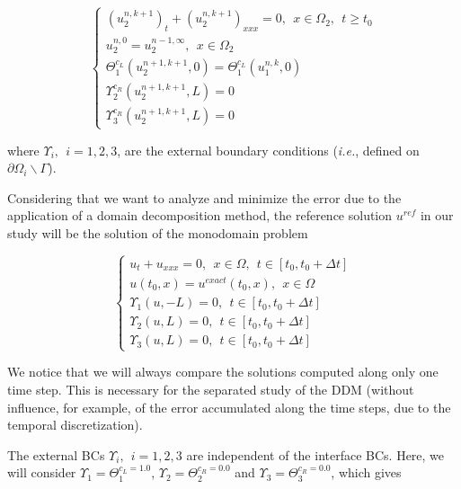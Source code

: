 \begin{equation}
    \label{eq:problemDDM2}
    \begin{cases}
        (u_2^{n,k+1})_t + (u_2^{n,k+1})_{xxx} = 0 , \ \ x \in \Omega_2, \ \ t \geq t_0\\
        u_2^{n,0} = u_2^{n-1,\infty} , \ \ x \in \Omega_2 \\
        \Theta_1^{c_L}(u_2^{n+1,k+1},0) = \Theta_1^{c_L}(u_1^{n,k},0) \\
        \Upsilon_2^{c_R}(u_2^{n+1,k+1},L) = 0 \\
        \Upsilon_3^{c_R}(u_2^{n+1,k+1},L) = 0
     \end{cases}
\end{equation}

\noindent where $ \Upsilon_i, \ \ i=1,2,3$, are the external boundary conditions (\emph{i.e.}, defined on $\partial \Omega_i \backslash \Gamma$). 

\indent Considering that we want to analyze and minimize the error due to the application of a domain decomposition method, the reference solution $u^{ref}$ in our study will be the solution of the monodomain problem

\begin{equation}
	\label{eq:problemMonodomain}
	\begin{cases}
	u_t + u_{xxx} = 0, \ \ x \in \Omega, \ \ t \in [t_0, t_0+\Delta t] \\
	u(t_0,x) = u^{exact}(t_0,x) , \ \ x \in \Omega \\ 
	\Upsilon_1(u,-L) = 0, \ \ t \in [t_0, t_0+\Delta t] \\
	\Upsilon_2(u,L) = 0, \ \ t \in [t_0, t_0+\Delta t] \\
	\Upsilon_3(u,L) = 0, \ \ t \in [t_0, t_0+\Delta t]
	\end{cases}
\end{equation}
	
\indent We notice that we will always compare the solutions computed along only one time step. This is necessary for the separated study of the DDM (without influence, for example, of the error accumulated along the time steps, due to the temporal discretization).

\indent The external BCs $ \Upsilon_i, \ \ i=1,2,3$ are independent of the interface BCs. Here, we will consider $\Upsilon_1 = \Theta_1^{c_L = 1.0}$, $\Upsilon_2 = \Theta_2^{c_R = 0.0}$ and $\Upsilon_3 = \Theta_3^{c_R = 0.0}$, which gives

